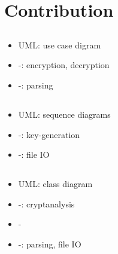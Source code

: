 \section{Contribution}



\subsection{\dd}
\begin{itemize}
\item UML: use case digram
\item \rsa-\cs: encryption, decryption
\item \cry-\cf: \cl{} parsing
\end{itemize}

\subsection{\md}
\begin{itemize}
\item UML: sequence diagrams
\item \rsa-\cs: key-generation
\item \cry-\cf: file IO
\end{itemize}

\subsection{\vp}
\begin{itemize}
\item UML: class diagram
\item \rsa-\cs: cryptanalysis
\item \dummy-\cs
\item \cry-\cf: \cl{} parsing, file IO
\end{itemize}
